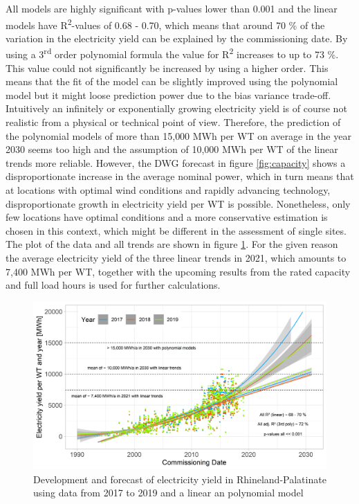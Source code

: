 \documentclass[a4paper,11pt]{article}
\begin{document}
All models are highly significant with p-values lower than 0.001 and the linear models have R\textsuperscript{2}-values of 0.68 - 0.70, which means that around 70 \% of the variation in the electricity yield can be explained by the commissioning date. By using a 3\textsuperscript{rd} order polynomial formula the value for R\textsuperscript{2} increases to up to 73 \%. This value could not significantly be increased by using a higher order. This means that the fit of the model can be slightly improved using the polynomial model but it might loose prediction power due to the bias variance trade-off. Intuitively an infinitely or exponentially growing electricity yield is of course not realistic from a physical or technical point of view. Therefore, the prediction of the polynomial models of more than 15,000 MWh per WT on average in the year 2030 seems too high and the assumption of 10,000 MWh per WT of the linear trends more reliable. However, the DWG forecast in figure \ref{fig:capacity} shows a disproportionate increase in the average nominal power, which in turn means that at locations with optimal wind conditions and rapidly advancing technology, disproportionate growth in electricity yield per WT is possible. Nonetheless, only few locations have optimal conditions and a more conservative estimation is chosen in this context, which might be different in the assessment of single sites. The plot of the data and all trends are shown in figure \ref{fig:electricityyield}. For the given reason the average electricity yield of the three linear trends in 2021, which amounts to 7,400 MWh per WT, together with the upcoming results from the rated capacity and full load hours is used for further calculations.
\begin{figure}

{\centering \includegraphics[width=1\linewidth]{data/Amprion/results_of_analysis/electricity_yield_2017-2019} 

}

\caption{Development and forecast of electricity yield in Rhineland-Palatinate using data from 2017 to 2019 and a linear an polynomial model}\label{fig:electricityyield}
\end{figure}
\end{document}
